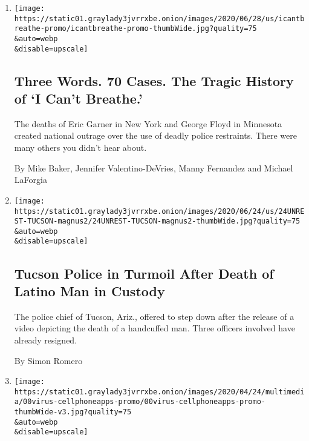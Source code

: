 \begin{enumerate}
\def\labelenumi{\arabic{enumi}.}
\item
  \href{/interactive/2020/06/28/us/i-cant-breathe-police-arrest.html}{}

  \texttt{[image: https://static01.graylady3jvrrxbe.onion/images/2020/06/28/us/icantbreathe-promo/icantbreathe-promo-thumbWide.jpg?quality=75\\\&auto=webp\\\&disable=upscale]}

  \hypertarget{three-words-70-cases-the-tragic-history-of-i-cant-breathe}{%
  \subsection{Three Words. 70 Cases. The Tragic History of `I Can't
  Breathe.'}\label{three-words-70-cases-the-tragic-history-of-i-cant-breathe}}

  The deaths of Eric Garner in New York and George Floyd in Minnesota
  created national outrage over the use of deadly police restraints.
  There were many others you didn't hear about.

  By Mike Baker, Jennifer Valentino-DeVries, Manny Fernandez and Michael
  LaForgia
\item
  \href{/2020/06/24/us/tucson-police-carlos-ingram-lopez-death.html}{}

  \texttt{[image: https://static01.graylady3jvrrxbe.onion/images/2020/06/24/us/24UNREST-TUCSON-magnus2/24UNREST-TUCSON-magnus2-thumbWide.jpg?quality=75\\\&auto=webp\\\&disable=upscale]}

  \hypertarget{tucson-police-in-turmoil-after-death-of-latino-man-in-custody}{%
  \subsection{Tucson Police in Turmoil After Death of Latino Man in
  Custody}\label{tucson-police-in-turmoil-after-death-of-latino-man-in-custody}}

  The police chief of Tucson, Ariz., offered to step down after the
  release of a video depicting the death of a handcuffed man. Three
  officers involved have already resigned.

  By Simon Romero
\item
  \href{/2020/04/29/business/coronavirus-cellphone-apps-contact-tracing.html}{}

  \texttt{[image: https://static01.graylady3jvrrxbe.onion/images/2020/04/24/multimedia/00virus-cellphoneapps-promo/00virus-cellphoneapps-promo-thumbWide-v3.jpg?quality=75\\\&auto=webp\\\&disable=upscale]}


\end{enumerate}

